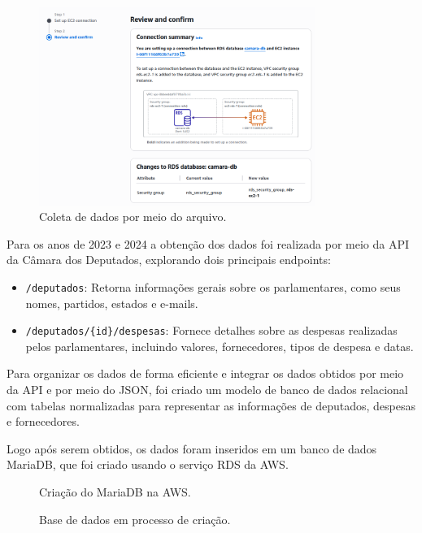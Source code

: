 \documentclass[12pt, a4paper]{article}
\begin{document}
\begin{figure}[h]
    \centering
    \includegraphics[width=0.8\textwidth]{assets/1.png}
    \caption{Coleta de dados por meio do arquivo.}
    \label{fig:arquivo_json}
\end{figure}

Para os anos de 2023 e 2024 a obtenção dos dados foi realizada por meio da API\cite{dados_abertos} da Câmara dos Deputados, explorando dois principais endpoints:
\begin{itemize}
    \item \texttt{/deputados}: Retorna informações gerais sobre os parlamentares, como seus nomes, partidos, estados e e-mails.
    \item \texttt{/deputados/\{id\}/despesas}: Fornece detalhes sobre as despesas realizadas pelos parlamentares, incluindo valores, fornecedores, tipos de despesa e datas.
\end{itemize}

Para organizar os dados de forma eficiente e integrar os dados obtidos por meio da API e por meio do JSON, foi criado um modelo de banco de dados relacional com tabelas normalizadas para representar as informações de deputados, despesas e fornecedores.

Logo após serem obtidos, os dados foram inseridos em um banco de dados MariaDB, que foi criado usando o serviço RDS da AWS.

\begin{figure}[h]
    \centering
    \caption{Criação do MariaDB na AWS.}
    \label{fig:criacao_mariadb}
\end{figure}

\begin{figure}[h]
    \centering
    \caption{Base de dados em processo de criação.}
    \label{fig:bd_criacao}
\end{figure}
\end{document}
